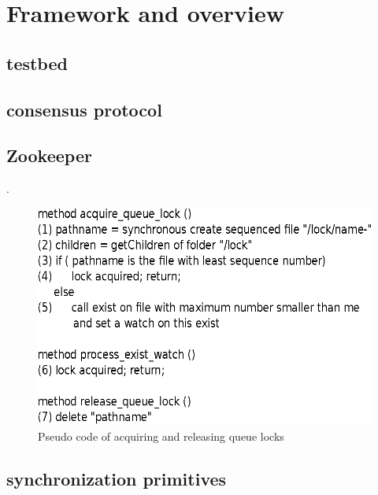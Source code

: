 \section{Framework and overview}\label{sec:framework}

\subsection{testbed}

\subsection{consensus protocol}

\subsection{Zookeeper}
.

\begin{figure}[h]
\centering
\includegraphics[scale=0.85]{img/queue_lock_pseudo.eps}
\caption{Pseudo code of acquiring and releasing queue locks}
\label{fig:queue_lock_pseudo}
\end{figure}

\subsection{synchronization primitives}

